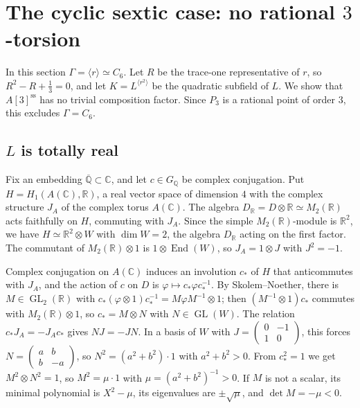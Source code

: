 \documentclass[11pt]{article}
\newcommand{\Q}{\mathbb Q}
\DeclareMathOperator{\End}{End}
\DeclareMathOperator{\GL}{GL}
\begin{document}
\section{The cyclic sextic case: no rational \texorpdfstring{\(3\)}{3}-torsion}\label{sec:sextic}

In this section \(\Gamma=\langle r\rangle\simeq C_6\). Let \(R\) be the
trace-one representative of \(r\), so \(R^2-R+\tfrac13=0\), and let
\(K=L^{\langle r^2\rangle}\) be the quadratic subfield of \(L\). We show
that \(A[3]^{\mathrm{ss}}\) has no trivial composition factor. Since
\(P_3\) is a rational point of order \(3\), this excludes
\(\Gamma=C_6\).

\subsection{\texorpdfstring{\(L\)}{L} is totally real}\label{sec:real}

Fix an embedding \(\overline{\Q}\subset\mathbb C\), and let
\(c\in G_{\Q}\) be complex conjugation. Put
\(H=H_1(A(\mathbb C),\mathbb R)\), a real vector space of dimension
\(4\) with the complex structure \(J_A\) of the complex torus
\(A(\mathbb C)\). The algebra
\(D_{\mathbb R}=D\otimes\mathbb R\simeq M_2(\mathbb R)\) acts faithfully
on \(H\), commuting with \(J_A\). Since the simple
\(M_2(\mathbb R)\)-module is \(\mathbb R^2\), we have
\(H\simeq\mathbb R^2\otimes W\) with \(\dim W=2\), the algebra
\(D_{\mathbb R}\) acting on the first factor. The commutant of
\(M_2(\mathbb R)\otimes1\) is \(1\otimes\End(W)\), so \(J_A=1\otimes J\)
with \(J^2=-1\).

Complex conjugation on \(A(\mathbb C)\) induces an involution \(c_*\) of
\(H\) that anticommutes with \(J_A\), and the action of \(c\) on \(D\) is
\(\varphi\mapsto c_*\varphi c_*^{-1}\). By Skolem--Noether, there is
\(M\in\GL_2(\mathbb R)\) with
\(c_*(\varphi\otimes1)c_*^{-1}=M\varphi M^{-1}\otimes1\); then
\((M^{-1}\otimes1)c_*\) commutes with \(M_2(\mathbb R)\otimes1\), so
\(c_*=M\otimes N\) with \(N\in\GL(W)\). The relation
\(c_*J_A=-J_Ac_*\) gives \(NJ=-JN\). In a basis of \(W\) with
\(J=\left(\begin{smallmatrix}0&-1\\1&0\end{smallmatrix}\right)\), this
forces \(N=\left(\begin{smallmatrix}a&b\\b&-a\end{smallmatrix}\right)\),
so \(N^2=(a^2+b^2)\cdot1\) with \(a^2+b^2>0\). From \(c_*^2=1\) we get
\(M^2\otimes N^2=1\), so \(M^2=\mu\cdot1\) with
\(\mu=(a^2+b^2)^{-1}>0\). If \(M\) is not a scalar, its minimal
polynomial is \(X^2-\mu\), its eigenvalues are \(\pm\sqrt\mu\), and
\(\det M=-\mu<0\).
\end{document}
